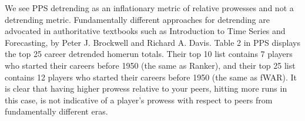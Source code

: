 \documentclass[11pt]{article}\usepackage[]{graphicx}\usepackage[]{color}
\begin{document}
We see PPS detrending as an inflationary metric of relative prowesses 
and not a detrending metric.  
Fundamentally different approaches for detrending are advocated in 
authoritative textbooks such as 
 Introduction to Time Series and Forecasting,
   by
 Peter J. Brockwell and Richard A. Davis.
Table 2 in PPS displays the top 25 career detrended homerun totals.  Their 
top 10 list contains 7 players who started their careers before 1950 
(the same as Ranker), and their 
top 25 list contains 12 players who started their careers before 1950 
(the same as fWAR).
It is clear that having higher prowess relative to your peers, hitting more 
runs in this case, is not indicative of a player's prowess with respect to 
peers from fundamentally different eras.  





\end{document}
